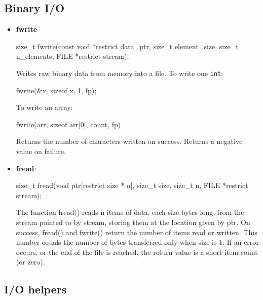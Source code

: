\documentclass{report}
\begin{document}
    \subsection{Binary I/O}
    \begin{itemize}
        \item \textbf{fwrite}
            \bigbreak \noindent 
            \begin{cppcode}
                size_t fwrite(const void *restrict data_ptr, size_t element_size, size_t n_elements, FILE *restrict stream); 
            \end{cppcode}
            \bigbreak \noindent 
            Writes raw binary data from memory into a file. To write one \texttt{int}:
            \bigbreak \noindent 
            \begin{cppcode}
            fwrite(&x, sizeof x, 1, fp);
            \end{cppcode}
            \bigbreak \noindent 
            To write an array:
            \bigbreak \noindent 
            \begin{cppcode}
                fwrite(arr, sizeof arr[0], count, fp)
            \end{cppcode}
            \bigbreak \noindent 
            Returns the number of characters written on success.
            \bigbreak \noindent 
            Returns a negative value on failure.
        \item \textbf{fread}:
            \bigbreak \noindent 
            \begin{cppcode}
            size_t fread(void ptr[restrict size * n], size_t size, size_t n, FILE *restrict stream);
            \end{cppcode}
            \bigbreak \noindent 
            The function fread() reads n items of data, each size bytes long, from the stream pointed to by stream, storing them at the location given by ptr.
            \bigbreak \noindent 
            On success, fread() and fwrite() return the number of items read or written.  This number equals the number of bytes transferred only when size is 1.  If an error occurs, or the end of the file is reached, the return value is a short item count (or zero).


    \end{itemize}

    \pagebreak 
    \subsection{I/O helpers}
\end{document}
